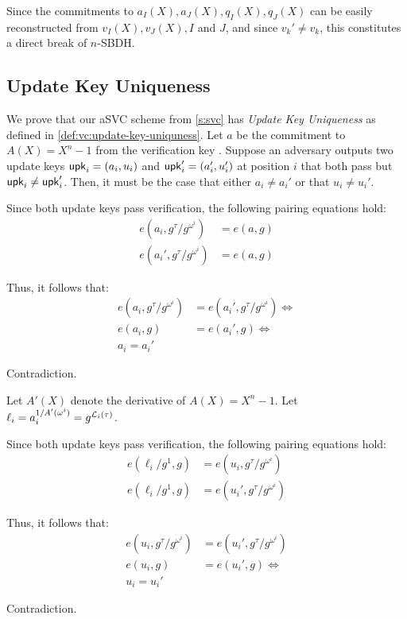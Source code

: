 Since the commitments to $a_I(X),a_J(X),q_I(X),q_J(X)$ can be easily reconstructed from $v_I(X),v_J(X), I$ and $J$, and since $v_k'\ne v_k$, this constitutes a direct break of $n$-SBDH.

\subsection{Update Key Uniqueness}
\label{s:update-key-uniqueness-proof}

We prove that our aSVC scheme from \cref{s:svc} has \textit{Update Key Uniqueness} as defined in \cref{def:vc:update-key-uniquness}.
Let $a$ be the commitment to $A(X)=X^n - 1$ from the verification key \vrk.
Suppose an adversary outputs two update keys $\mathsf{upk}_i = (a_i, u_i)$ and $\mathsf{upk}_i'=(a_i',u_i')$ at position $i$ that both pass \vcverifyupk but $\mathsf{upk}_i\ne \mathsf{upk}_i'$.
Then, it must be the case that either $a_i \ne a_i'$ or that $u_i \ne u_i'$.

Since both update keys pass verification, the following pairing equations hold:
\begin{align}
e(a_i, g^\tau / g^{\omega^i}) &= e(a, g)\\
e(a_i', g^\tau / g^{\omega^i}) &= e(a, g)
\end{align}

Thus, it follows that:
\begin{align}
e(a_i, g^\tau / g^{\omega^i}) &= e(a_i', g^\tau / g^{\omega^i})\Leftrightarrow\\
e(a_i, g) &= e(a_i', g)\Leftrightarrow\\
a_i = a_i'
\end{align}

Contradiction.

Let $A'(X)$ denote the derivative of $A(X)=X^n - 1$.
Let $\ell_i=a_i^{1/A'(\omega^i)}=g^{\mathcal{L}_i(\tau)}$.

Since both update keys pass verification, the following pairing equations hold:
\begin{align}
e(\ell_i/g^1, g) &= e(u_i,g^\tau/g^{\omega^i})\\
e(\ell_i/g^1, g) &= e(u_i',g^\tau/g^{\omega^i})
\end{align}

Thus, it follows that:
\begin{align}
e(u_i,g^\tau/g^{\omega^i}) &= e(u_i',g^\tau/g^{\omega^i})\\
e(u_i, g) &= e(u_i', g)\Leftrightarrow\\
u_i = u_i'
\end{align}

Contradiction.